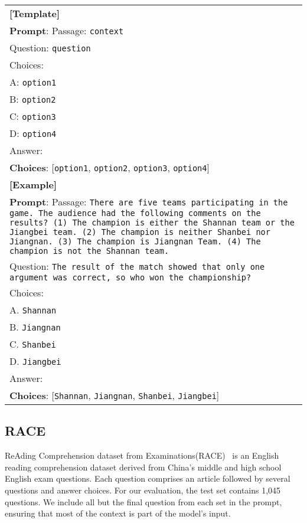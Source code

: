 \begin{table}[H]
\centering
\begin{small}
\begin{tabular}{|p{7cm}|}\hline
\textbf{[Template]} \\
\textbf{Prompt}: Passage: \texttt{context}\\
Question: \texttt{question} \\
Choices: \\
A: \texttt{option1}\\
B: \texttt{option2}\\
C: \texttt{option3}\\
D: \texttt{option4}\\
Answer: \\
\textbf{Choices}: [\texttt{option1}, \texttt{option2}, \texttt{option3}, \texttt{option4}] \\
\hline \textbf{[Example]} \\
\textbf{Prompt}: Passage: \texttt{There are five teams participating in the game. The audience had the following comments on the results? (1) The champion is either the Shannan team or the Jiangbei team. (2) The champion is neither Shanbei nor Jiangnan. (3) The champion is Jiangnan Team. (4) The champion is not the Shannan team.} \\
Question: \texttt{The result of the match showed that only one argument was correct, so who won the championship?}
\\Choices:\\A. \texttt{Shannan}\\B. \texttt{Jiangnan}\\C.                \texttt{Shanbei}\\D. \texttt{Jiangbei}\\Answer:\\
\textbf{Choices}: [\texttt{Shannan}, \texttt{Jiangnan}, \texttt{Shanbei}, \texttt{Jiangbei}] \\ \hline
\end{tabular}
\end{small}
\end{table}

\newpage
\subsection{RACE}

ReAding Comprehension dataset from Examinations(RACE)~\cite{lai2017race} is an English reading comprehension dataset derived from China's middle and high school English exam questions. Each question comprises an article followed by several questions and answer choices. For our evaluation, the test set contains 1,045 questions. We include all but the final question from each set in the prompt, ensuring that most of the context is part of the model's input.

